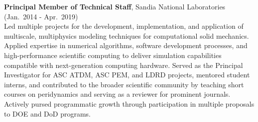 \begin{minipage}{\minipagewidth}
\textbf{Principal Member of Technical Staff}, Sandia National Laboratories (Jan.~2014 - Apr.~2019) \\
%
Led multiple projects for the development, implementation, and application of multiscale, multiphysics modeling techniques for computational solid mechanics.  Applied expertise in numerical algorithms, software development processes, and high-performance scientific computing to deliver simulation capabilities compatible with next-generation computing hardware.  Served as the Principal Investigator for ASC ATDM, ASC PEM, and LDRD projects, mentored student interns, and contributed to the broader scientific community by teaching short courses on peridynamics and serving as a reviewer for prominent journals.  Actively pursed programmatic growth through participation in multiple proposals to DOE and DoD programs.


%



\end{minipage}
